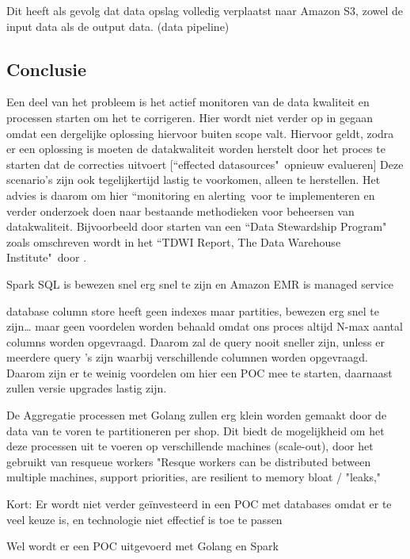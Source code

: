 Dit heeft als gevolg dat data opslag volledig verplaatst naar Amazon S3, zowel de input data als de output data. (data pipeline)

    
\subsection{Conclusie}

Een deel van het probleem is het actief monitoren van de data kwaliteit en processen starten om het te corrigeren. Hier wordt niet verder op in gegaan omdat een dergelijke oplossing hiervoor buiten scope valt. Hiervoor geldt, zodra er een oplossing is moeten de datakwaliteit worden herstelt door het proces te starten dat de correcties uitvoert [``effected datasources"\ opnieuw evalueren]
Deze scenario's zijn ook tegelijkertijd lastig te voorkomen, alleen te herstellen. Het advies is daarom om hier ``monitoring en alerting\ voor te implementeren en verder onderzoek doen naar bestaande methodieken voor beheersen van datakwaliteit. Bijvoorbeeld door starten van een ``Data Stewardship Program" zoals omschreven wordt in het ``TDWI Report, The Data Warehouse Institute"\ door  \textcite{eckerson2002data}.

Spark SQL is bewezen snel erg snel te zijn en Amazon EMR is managed service

database column store heeft geen indexes maar partities, bewezen erg snel te zijn… maar geen voordelen worden behaald omdat  ons proces altijd N-max aantal columns worden opgevraagd. Daarom zal de query nooit sneller zijn, unless er meerdere query 's zijn waarbij verschillende columnen worden opgevraagd. Daarom zijn er te weinig voordelen om hier een POC mee te starten, daarnaast zullen versie upgrades lastig zijn. 

De Aggregatie processen met Golang zullen erg klein worden gemaakt door de data van te voren te partitioneren per shop. Dit biedt de mogelijkheid om het deze processen uit te voeren op verschillende machines (scale-out), door het gebruikt van resqueue workers "Resque workers can be distributed between multiple machines, support priorities, are resilient to memory bloat / "leaks," \parencite{github2016reque} 


Kort: Er wordt niet verder geïnvesteerd in een POC met databases omdat er te veel keuze is, en technologie niet effectief is toe te passen

Wel wordt er een POC uitgevoerd met Golang en Spark


